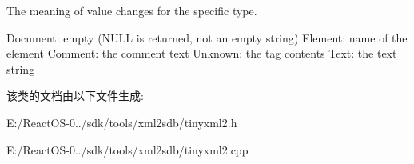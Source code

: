 The meaning of \textquotesingle{}value\textquotesingle{} changes for the specific type. \begin{DoxyVerb}Document:   empty (NULL is returned, not an empty string)
Element:    name of the element
Comment:    the comment text
Unknown:    the tag contents
Text:       the text string
\end{DoxyVerb}
 

该类的文档由以下文件生成\+:\begin{DoxyCompactItemize}
\item 
E\+:/\+React\+O\+S-\/0../sdk/tools/xml2sdb/tinyxml2.\+h\item 
E\+:/\+React\+O\+S-\/0../sdk/tools/xml2sdb/tinyxml2.\+cpp\end{DoxyCompactItemize}
